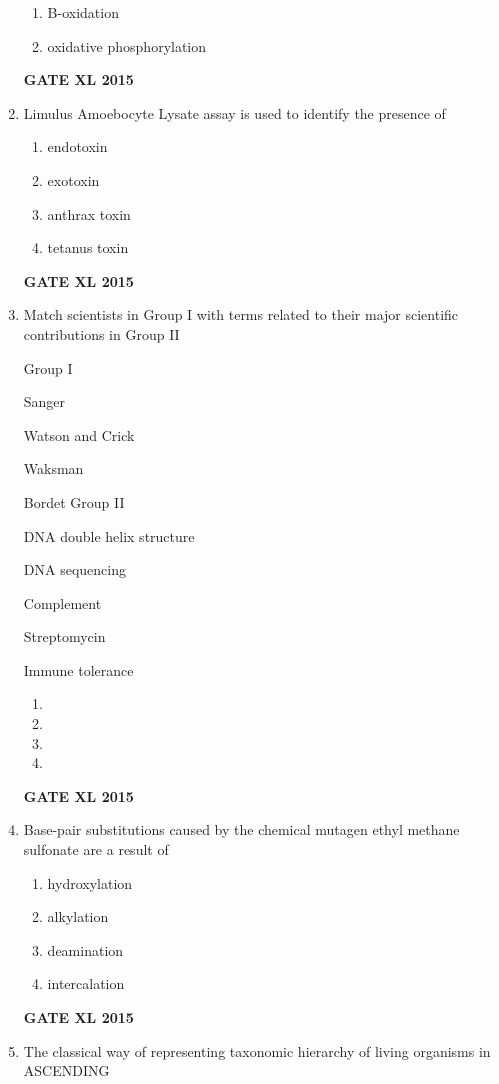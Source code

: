 \documentclass[journal,12pt,onecolumn]{IEEEtran}
\begin{document}
\begin{enumerate}
\begin{enumerate}
	    \item B-oxidation
            \item oxidative phosphorylation
    \end{enumerate}
\begin{flushright}\textbf{GATE XL 2015}\end{flushright}
\item  Limulus Amoebocyte Lysate  assay is used to identify the presence of
    \begin{enumerate}
            \item endotoxin
	    \item exotoxin
	    \item anthrax toxin
            \item tetanus toxin
    \end{enumerate}
\begin{flushright}\textbf{GATE XL 2015}\end{flushright}
\item Match scientists in Group I with terms related to their major scientific contributions in Group II

Group I

 Sanger

 Watson and Crick

 Waksman

 Bordet
Group II

 DNA double helix structure

 DNA sequencing

 Complement

 Streptomycin

 Immune tolerance
    \begin{enumerate}
            \item 
	    \item 
	    \item 
            \item 
    \end{enumerate}
\begin{flushright}\textbf{GATE XL 2015}\end{flushright}
\item Base-pair substitutions caused by the chemical mutagen ethyl methane sulfonate are a result of
    \begin{enumerate}
            \item hydroxylation
	    \item alkylation
	    \item deamination
            \item intercalation
    \end{enumerate}
\begin{flushright}\textbf{GATE XL 2015}\end{flushright}
\item  The classical way of representing taxonomic hierarchy of living organisms in ASCENDING


\end{enumerate}
\end{document}
